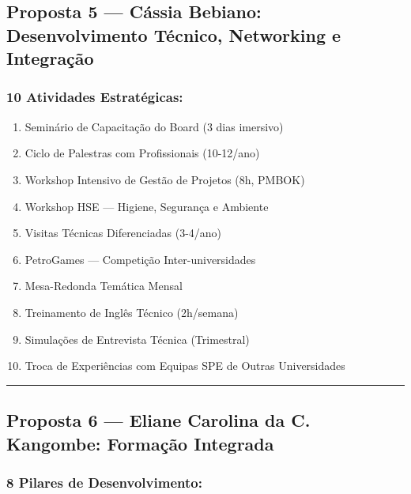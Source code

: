 \documentclass[12pt,a4paper]{article}
\begin{document}
\subsection{Proposta 5 — Cássia Bebiano: Desenvolvimento Técnico, Networking e Integração}

\subsubsection*{10 Atividades Estratégicas:}

\begin{enumerate}[itemsep=0.15cm]
    \item Seminário de Capacitação do Board (3 dias imersivo)
    \item Ciclo de Palestras com Profissionais (10-12/ano)
    \item Workshop Intensivo de Gestão de Projetos (8h, PMBOK)
    \item Workshop HSE — Higiene, Segurança e Ambiente
    \item Visitas Técnicas Diferenciadas (3-4/ano)
    \item PetroGames — Competição Inter-universidades
    \item Mesa-Redonda Temática Mensal
    \item Treinamento de Inglês Técnico (2h/semana)
    \item Simulações de Entrevista Técnica (Trimestral)
    \item Troca de Experiências com Equipas SPE de Outras Universidades
\end{enumerate}

\textcolor{spe-secondary}{\hspace{0.5cm}\rule{0.4\linewidth}{0.8pt}}

\subsection{Proposta 6 — Eliane Carolina da C. Kangombe: Formação Integrada}

\subsubsection*{8 Pilares de Desenvolvimento:}
\end{document}
